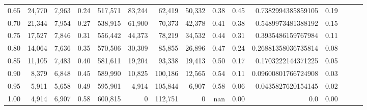 \begin{tabular}{rrrrrrrrrrrrrrr}
0.65 &  24,770 &  7,963 &  0.24 &  517,571 &   83,244 &   62,419 &   50,332 &  0.38 &  0.45 &   0.7382994385859105 &      0.19 \\
0.70 &  21,344 &  7,954 &  0.27 &  538,915 &   61,900 &   70,373 &   42,378 &  0.41 &  0.38 &   0.5489973481388192 &      0.15 \\
0.75 &  17,527 &  7,846 &  0.31 &  556,442 &   44,373 &   78,219 &   34,532 &  0.44 &  0.31 &   0.3935486159767984 &      0.11 \\
0.80 &  14,064 &  7,636 &  0.35 &  570,506 &   30,309 &   85,855 &   26,896 &  0.47 &  0.24 &  0.26881358036735814 &      0.08 \\
0.85 &  11,105 &  7,483 &  0.40 &  581,611 &   19,204 &   93,338 &   19,413 &  0.50 &  0.17 &   0.1703222144371225 &      0.05 \\
0.90 &   8,379 &  6,848 &  0.45 &  589,990 &   10,825 &  100,186 &   12,565 &  0.54 &  0.11 &  0.09600801766724908 &      0.03 \\
0.95 &   5,911 &  5,658 &  0.49 &  595,901 &    4,914 &  105,844 &    6,907 &  0.58 &  0.06 &   0.0435827620154145 &      0.02 \\
1.00 &   4,914 &  6,907 &  0.58 &  600,815 &        0 &  112,751 &        0 &   nan &  0.00 &                  0.0 &      0.00 \\
\bottomrule
\end{tabular}
